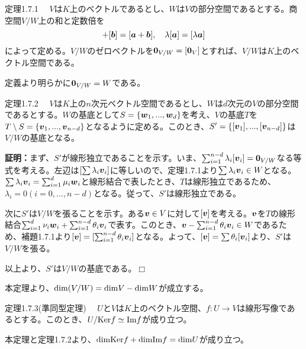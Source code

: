 \documentclass[dvipdfmx, 9pt, a4paper]{jsarticle}
\numberwithin{equation}{subsection}
\newcommand{\bm}[1]{{\mbox{\boldmath $#1$}}}
\def\qed{\hfill $\Box$}
\begin{document}
\begin{itembox}[l]{定理1.7.1}
　$V$は$K$上のベクトルであるとし、$W$は$V$の部分空間であるとする。商空間$V/W$上の和と定数倍を
\begin{equation}
[\bm a]+[\bm b]=[\bm a+\bm b],~~~\lambda[\bm a]=[\lambda \bm a] \notag
\end{equation}
によって定める。$V/W$のゼロベクトルを$\bm 0_{V/W}=[\bm 0_V]$とすれば、$V/W$は$K$上のベクトル空間である。
\end{itembox}\par
定義より明らかに$\bm 0_{V/W}=W$である。
\begin{itembox}[l]{定理1.7.2}
　$V$は$K$上の$n$次元ベクトル空間であるとし、$W$は$d$次元の$V$の部分空間であるとする。$W$の基底として$S=\{\bm w_1, ..., \bm w_d\}$を考え、$V$の基底$T$を$T\setminus S=\{\bm v_1, ..., \bm v_{n-d}\}$となるように定める。このとき、$S'=\{[\bm v_1], ..., [\bm v_{n-d}]\}$は$V/W$の基底となる。
\end{itembox}
{\bf 証明：}まず、$S'$が線形独立であることを示す。いま、$\sum_{i=1}^{n-d} \lambda_i[\bm v_i]=\bm 0_{V/W}$なる等式を考える。左辺は$[\sum \lambda_i \bm v_i]$に等しいので、定理1.7.1より$\sum \lambda_i \bm v_i \in W$となる。$\sum \lambda_i \bm v_i=\sum_{i=1}^d\mu_i \bm w_i$と線形結合で表したとき、$T$は線形独立であるため、$\lambda_i=0(i=0, ..., n-d)$となる。従って、$S'$は線形独立である。\par
次に$S'$は$V/W$を張ることを示す。ある$\bm v \in V$に対して$[\bm v]$を考える。$\bm v$を$T$の線形結合$\sum_{i=1}^{d}\nu_i\bm w_i+\sum_{i=1}^{n-d}\theta_i\bm v_i$で表す。このとき、$\bm v-\sum_{i=1}^{n-d}\theta_i\bm v_i \in W$であるため、補題1.7.1より$[\bm v]=[\sum_{i=1}^{n-d}\theta_i\bm v_i]$となる。よって、$[\bm v]=\sum \theta_i[\bm v_i]$より、$S'$は$V/W$を張る。\par
以上より、$S'$は$V/W$の基底である。\qed \par
本定理より、${\rm dim}(V/W)={\rm dim}V-{\rm dim}W$が成立する。
\begin{itembox}[l]{定理1.7.3(準同型定理)}
　$U$と$V$は$K$上のベクトル空間、$f:U \to V$は線形写像であるとする。このとき、$U/{\rm Ker}f \simeq {\rm Im}f$が成り立つ。
\end{itembox}\par
本定理と定理1.7.2より、${\rm dim}{\rm Ker}f+{\rm dim}{\rm Im}f={\rm dim}U$が成り立つ。
\end{document}
